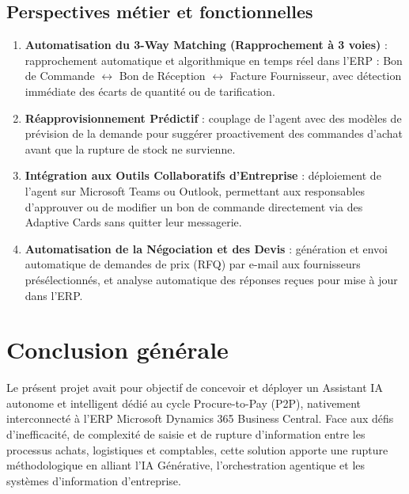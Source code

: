 \subsection{Perspectives métier et fonctionnelles}
\begin{enumerate}
    \item \textbf{Automatisation du 3-Way Matching (Rapprochement à 3 voies)} : rapprochement automatique et algorithmique en temps réel dans l'ERP : Bon de Commande $\leftrightarrow$ Bon de Réception $\leftrightarrow$ Facture Fournisseur, avec détection immédiate des écarts de quantité ou de tarification.
    \item \textbf{Réapprovisionnement Prédictif} : couplage de l'agent avec des modèles de prévision de la demande pour suggérer proactivement des commandes d'achat avant que la rupture de stock ne survienne.
    \item \textbf{Intégration aux Outils Collaboratifs d'Entreprise} : déploiement de l'agent sur Microsoft Teams ou Outlook, permettant aux responsables d'approuver ou de modifier un bon de commande directement via des Adaptive Cards sans quitter leur messagerie.
    \item \textbf{Automatisation de la Négociation et des Devis} : génération et envoi automatique de demandes de prix (RFQ) par e-mail aux fournisseurs présélectionnés, et analyse automatique des réponses reçues pour mise à jour dans l'ERP.
\end{enumerate}

\section{Conclusion générale}
Le présent projet avait pour objectif de concevoir et déployer un Assistant IA autonome et intelligent dédié au cycle Procure-to-Pay (P2P), nativement interconnecté à l'ERP Microsoft Dynamics 365 Business Central. Face aux défis d'inefficacité, de complexité de saisie et de rupture d'information entre les processus achats, logistiques et comptables, cette solution apporte une rupture méthodologique en alliant l'IA Générative, l'orchestration agentique et les systèmes d'information d'entreprise.